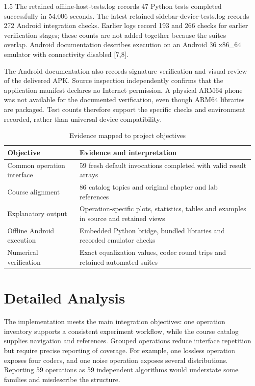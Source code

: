 \begin{spacing}{1.5}
The retained offline-host-tests.log records 47 Python tests completed successfully in 54.006 seconds. The latest retained sidebar-device-tests.log records 272 Android integration checks. Earlier logs record 193 and 266 checks for earlier verification stages; these counts are not added together because the suites overlap. Android documentation describes execution on an Android 36 x86\_64 emulator with connectivity disabled [7,8].

The Android documentation also records signature verification and visual review of the delivered APK. Source inspection independently confirms that the application manifest declares no Internet permission. A physical ARM64 phone was not available for the documented verification, even though ARM64 libraries are packaged. Test counts therefore support the specific checks and environment recorded, rather than universal device compatibility.

\begin{table}[htbp]\centering\small
\caption{Evidence mapped to project objectives}
\begin{tabularx}{\textwidth}{XX}
\toprule
\textbf{Objective} & \textbf{Evidence and interpretation}\\\midrule
Common operation interface & 59 fresh default invocations completed with valid result arrays\\
Course alignment & 86 catalog topics and original chapter and lab references\\
Explanatory output & Operation-specific plots, statistics, tables and examples in source and retained views\\
Offline Android execution & Embedded Python bridge, bundled libraries and recorded emulator checks\\
Numerical verification & Exact equalization values, codec round trips and retained automated suites\\
\bottomrule\end{tabularx}\end{table}
\section{Detailed Analysis}
The implementation meets the main integration objectives: one operation inventory supports a consistent experiment workflow, while the course catalog supplies navigation and references. Grouped operations reduce interface repetition but require precise reporting of coverage. For example, one lossless operation exposes four codecs, and one noise operation exposes several distributions. Reporting 59 operations as 59 independent algorithms would understate some families and misdescribe the structure.


\end{spacing}
